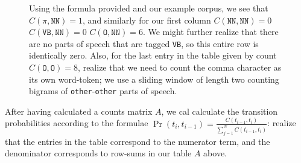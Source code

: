 \documentclass[12pt]{article}
\begin{document}
\begin{figure}[h]
  \begin{center}
  \caption{Using the formula provided and our example corpus, we see that $C(\pi, \texttt{NN}) = 1$, and similarly for our first column 
$C(\texttt{NN}, \texttt{NN}) = 0$
$C(\texttt{VB}, \texttt{NN}) = 0$
$C(\texttt{O}, \texttt{NN}) = 6$. We might further realize that there are no parts of speech that are tagged \texttt{VB}, so this entire row is identically zero. Also, for the last entry in the table given by count $C(\texttt{O}, \texttt{O}) = 8$, realize that we need to count the comma character as its own word-token; we use a sliding window of length two counting bigrams of \texttt{other}-\texttt{other} parts of speech.}
\end{center}
\end{figure}
\label{fig: countsezra}

After having calculated a counts matrix $A$, we cal calculate the transition probabilities according to the formulae $\Pr(t_i, t_{i-1}) = \frac{C(t_{i-1}, t_i)}{\sum_{j=1}^N C(t_{i-1}, t_i)}$: realize that the entries in the table correspond to the numerator term, and the denominator corresponds to row-sums in our table $A$ above.
\end{document}
